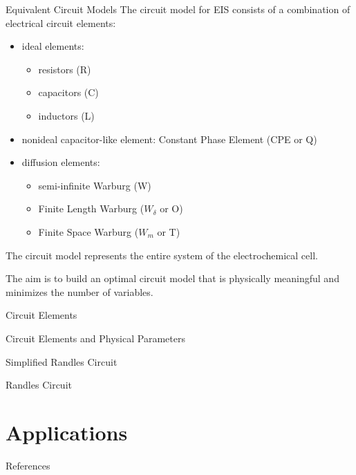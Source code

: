 \documentclass[10pt,compress,handout]{beamer}
\begin{document}
    \begin{frame}{Equivalent Circuit Models}
        The circuit model for EIS consists of a combination of electrical circuit elements:
        \begin{itemize}
            \item ideal elements:
            \begin{itemize}
                \item  resistors (R)
                \item  capacitors (C)
                \item inductors (L)
            \end{itemize}
            \item nonideal capacitor-like element: Constant Phase Element (CPE or Q)
            \item diffusion elements:
            \begin{itemize}
                \item semi-infinite Warburg (W)
                \item Finite Length Warburg ($W_{\delta}$ or O)
                \item Finite Space Warburg ($W_m$ or T)
            \end{itemize}
        \end{itemize}
        The circuit model represents the entire system of the electrochemical cell.
    
        The aim is to build an optimal circuit model that is physically meaningful and minimizes the
        number of variables.
    \end{frame}

    \begin{frame}{Circuit Elements}
        
    \end{frame}
    
    \begin{frame}{Circuit Elements and Physical Parameters}
        
    \end{frame}
    
    \begin{frame}{Simplified Randles Circuit}
        
    \end{frame}

    \begin{frame}{Randles Circuit}
        
    \end{frame}

\section{Applications}

\begin{frame}[allowframebreaks=0.9]{References}
\AtNextBibliography{\tiny}
\printbibliography
\end{frame}
\end{document}
